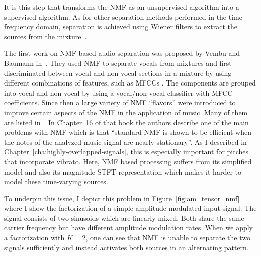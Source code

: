 It is this step that transforms the NMF as an unsupervised algorithm into a supervised algorithm.
As for other separation methods performed in the time-frequency domain, separation is achieved using Wiener filters to extract the sources from the mixture~\cite{liutkus15c}.
\par
The first work on NMF based audio separation was proposed by Vembu and Baumann in~\cite{vembu05}. 
They used NMF to separate vocals from mixtures and first discriminated between vocal and non-vocal sections in a mixture by using different combinations of features, such as MFCCs \cite{david80}. 
The components are grouped into vocal and non-vocal by using a vocal/non-vocal classifier with MFCC coefficients.
Since then a large variety of NMF ``flavors'' were introduced to improve certain aspects of the NMF in the application of music. 
Many of them are listed in~\cite{vincent}.
In Chapter~16 of that book the authors describe one of the main problems with NMF which is that ``standard NMF is shown to be efficient when the notes of the analyzed music signal are nearly stationary''.
As I described in Chapter~\ref{cha:highly-overlapped-signals}, this is especially important for pitches that incorporate vibrato.
Here, NMF based processing suffers from its simplified model and also its magnitude STFT representation which makes it harder to model these time-varying sources.
\par
To underpin this issue, I depict this problem in Figure~\ref{fig:am_tensor_nmf} where I show the factorization of a simple amplitude modulated input signal. 
The signal consists of two sinusoids which are linearly mixed. 
Both share the same carrier frequency but have different amplitude modulation rates. 
When we apply a factorization with $K=2$, one can see that NMF is unable to separate the two signals sufficiently and instead activates both sources in an alternating pattern.
